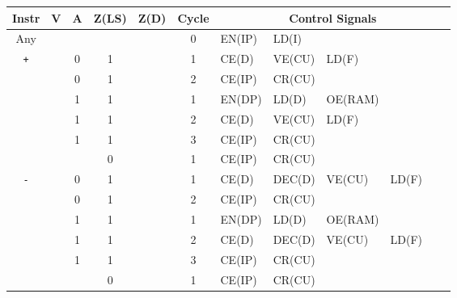 \begin{landscape}
  \begin{longtable}[c] {c|cccc|c|llllll}
                     Instr        & V & A & Z(LS) & Z(D) & Cycle & \multicolumn{6}{c}{Control Signals}                      \\ \hline
    \rowcolor{White} Any          &   &   &       &      & 0     & EN(IP)   & LD(I)    &         &        &        &        \\ \hline
    \rowcolor{Gray}  \texttt{+}   &   & 0 & 1     &      & 1     & CE(D)    & VE(CU)   & LD(F)   &        &        &        \\
    \rowcolor{Gray}               &   & 0 & 1     &      & 2     & CE(IP)   & CR(CU)   &         &        &        &        \\    
    \rowcolor{White}              &   & 1 & 1     &      & 1     & EN(DP)   & LD(D)    & OE(RAM) &        &        &        \\
    \rowcolor{White}              &   & 1 & 1     &      & 2     & CE(D)    & VE(CU)   & LD(F)   &        &        &        \\
    \rowcolor{White}              &   & 1 & 1     &      & 3     & CE(IP)   & CR(CU)   &         &        &        &        \\
    \rowcolor{Gray}               &   &   & 0     &      & 1     & CE(IP)   & CR(CU)   &         &        &        &        \\ \hline
    
    \rowcolor{White} \texttt{-}   &   & 0 & 1     &      & 1     & CE(D)    & DEC(D)   & VE(CU)  & LD(F)  &        &        \\
    \rowcolor{White}              &   & 0 & 1     &      & 2     & CE(IP)   & CR(CU)   &         &        &        &        \\
    \rowcolor{Gray}               &   & 1 & 1     &      & 1     & EN(DP)   & LD(D)    & OE(RAM) &        &        &        \\
    \rowcolor{Gray}               &   & 1 & 1     &      & 2     & CE(D)    & DEC(D)   & VE(CU)  & LD(F)  &        &        \\
    \rowcolor{Gray}               &   & 1 & 1     &      & 3     & CE(IP)   & CR(CU)   &         &        &        &        \\
    \rowcolor{White}              &   &   & 0     &      & 1     & CE(IP)   & CR(CU)   &         &        &        &        \\ \hline
    

\end{longtable}
\end{landscape}
